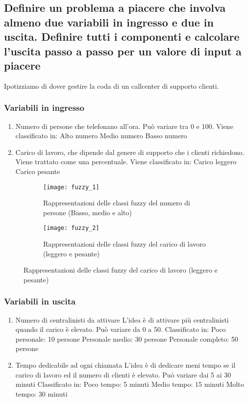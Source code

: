 \documentclass[\main/main.tex]{subfiles}
\begin{document}
\subsection{Definire un problema a piacere che involva almeno due variabili in ingresso e due in uscita. Definire tutti i componenti e calcolare l'uscita passo a passo per un valore di input a piacere}

Ipotizziamo di dover gestire la coda di un callcenter di supporto clienti.
\subsubsection*{Variabili in ingresso}
\begin{enumerate}
	\item Numero di persone che telefonano all'ora.
	      \subitem Può variare tra 0 e 100.
	      \subitem Viene classificato in:
	      \subsubitem Alto numero
	      \subsubitem Medio numero
	      \subsubitem Basso numero
	\item Carico di lavoro, che dipende dal genere di supporto che i clienti richiedono.
	      \subitem Viene trattato come una percentuale.
	      \subitem Viene classificato in:
	      \subsubitem Carico leggero
	      \subsubitem Carico pesante
\end{enumerate}

\begin{figure}
	\begin{subfigure}{0.49\textwidth}
		\texttt{[image: fuzzy\_1]}
		\caption{Rappresentazioni delle classi fuzzy del numero di persone (Basso, medio e alto)}
	\end{subfigure}
	\begin{subfigure}{0.49\textwidth}
		\texttt{[image: fuzzy\_2]}
		\caption{Rappresentazioni delle classi fuzzy del carico di lavoro (leggero e pesante)}
	\end{subfigure}
\end{figure}

\subsubsection*{Variabili in uscita}
\begin{enumerate}
	\item Numero di centralinisti da attivare
	      \subitem L'idea è di attivare più centralinisti quando il carico è elevato.
	      \subitem Può variare da 0 a 50.
	      \subitem Classificato in:
	      \subsubitem Poco personale: 10 persone
	      \subsubitem Personale medio: 30 persone
	      \subsubitem Personale completo: 50 persone
	\item Tempo dedicabile ad ogni chiamata
	      \subitem L'idea è di dedicare meni tempo se il carico di lavoro ed il numero di clienti è elevato.
	      \subitem Può variare dai 5 ai 30 minuti
	      \subitem Classificato in:
	      \subsubitem Poco tempo: 5 minuti
	      \subsubitem Medio tempo: 15 minuti
	      \subsubitem Molto tempo: 30 minuti
\end{enumerate}
\end{document}
